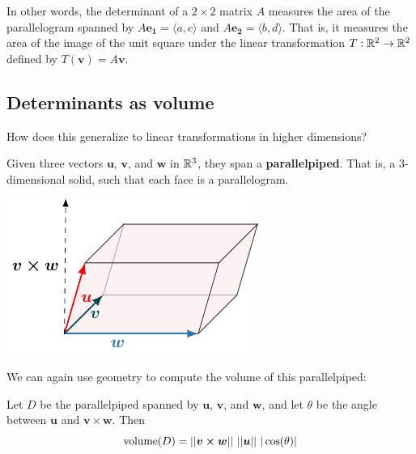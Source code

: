 In other words, the determinant of a $2 \times 2$ matrix $A$ measures the area of the parallelogram spanned by $A\bm{e_1} = \langle a, c \rangle $ and $A\bm{e_2} = \langle b, d \rangle$.   That is, it measures the area of the image of the unit square under the linear transformation $T: \mathbb{R}^2 \to \mathbb{R}^2$ defined by $T(\bm{v}) = A\bm{v}$.


\subsection{Determinants as volume}\label{sec:detvolume}

\begin{motivating}
How does this generalize to linear transformations in higher dimensions?
\end{motivating}

\begin{definition}
    
Given three vectors $\bm{u}$, $\bm{v}$, and $\bm{w}$ in $\mathbb{R}^3$, they span a \textbf{parallelpiped}.  That is, a 3-dimensional solid, such that each face is a parallelogram.


 \begin{center}        
        \includegraphics{chapters/1-LinearAlgebra/figures/figures-parallelpiped.pdf}
    \end{center}
    
\end{definition}

We can again use geometry to compute the volume of this parallelpiped:

\begin{theorem}
    Let $D$ be the parallelpiped spanned by $\bm{u}$, $\bm{v}$, and $\bm{w}$, and let $\theta$ be the angle between $\bm{u}$ and $\bm{v \times w}$. Then $$\textnormal{volume}(D) = ||\bm{v \times w}|| \ ||\bm{u}|| \ |\cos(\theta)|$$
    \end{theorem}

